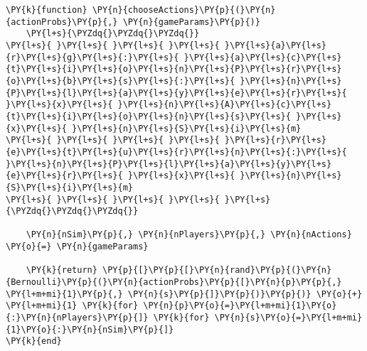\documentclass[main.tex]{subfiles}
\begin{document}
    \begin{tcolorbox}[breakable, size=fbox, boxrule=1pt, pad at break*=1mm,colback=cellbackground, colframe=cellborder]
\begin{Verbatim}[commandchars=\\\{\}]
\PY{k}{function} \PY{n}{chooseActions}\PY{p}{(}\PY{n}{actionProbs}\PY{p}{,} \PY{n}{gameParams}\PY{p}{)}
    \PY{l+s}{\PYZdq{}\PYZdq{}\PYZdq{}}
\PY{l+s}{ }\PY{l+s}{ }\PY{l+s}{ }\PY{l+s}{ }\PY{l+s}{a}\PY{l+s}{r}\PY{l+s}{g}\PY{l+s}{:}\PY{l+s}{ }\PY{l+s}{a}\PY{l+s}{c}\PY{l+s}{t}\PY{l+s}{i}\PY{l+s}{o}\PY{l+s}{n}\PY{l+s}{P}\PY{l+s}{r}\PY{l+s}{o}\PY{l+s}{b}\PY{l+s}{s}\PY{l+s}{:}\PY{l+s}{ }\PY{l+s}{n}\PY{l+s}{P}\PY{l+s}{l}\PY{l+s}{a}\PY{l+s}{y}\PY{l+s}{e}\PY{l+s}{r}\PY{l+s}{ }\PY{l+s}{x}\PY{l+s}{ }\PY{l+s}{n}\PY{l+s}{A}\PY{l+s}{c}\PY{l+s}{t}\PY{l+s}{i}\PY{l+s}{o}\PY{l+s}{n}\PY{l+s}{s}\PY{l+s}{ }\PY{l+s}{x}\PY{l+s}{ }\PY{l+s}{n}\PY{l+s}{S}\PY{l+s}{i}\PY{l+s}{m}
\PY{l+s}{ }\PY{l+s}{ }\PY{l+s}{ }\PY{l+s}{ }\PY{l+s}{r}\PY{l+s}{e}\PY{l+s}{t}\PY{l+s}{u}\PY{l+s}{r}\PY{l+s}{n}\PY{l+s}{:}\PY{l+s}{ }\PY{l+s}{n}\PY{l+s}{P}\PY{l+s}{l}\PY{l+s}{a}\PY{l+s}{y}\PY{l+s}{e}\PY{l+s}{r}\PY{l+s}{ }\PY{l+s}{x}\PY{l+s}{ }\PY{l+s}{n}\PY{l+s}{S}\PY{l+s}{i}\PY{l+s}{m}
\PY{l+s}{ }\PY{l+s}{ }\PY{l+s}{ }\PY{l+s}{ }\PY{l+s}{\PYZdq{}\PYZdq{}\PYZdq{}}
    
    \PY{n}{nSim}\PY{p}{,} \PY{n}{nPlayers}\PY{p}{,} \PY{n}{nActions} \PY{o}{=} \PY{n}{gameParams}

    \PY{k}{return} \PY{p}{[}\PY{p}{[}\PY{n}{rand}\PY{p}{(}\PY{n}{Bernoulli}\PY{p}{(}\PY{n}{actionProbs}\PY{p}{[}\PY{n}{p}\PY{p}{,} \PY{l+m+mi}{1}\PY{p}{,} \PY{n}{s}\PY{p}{]}\PY{p}{)}\PY{p}{)} \PY{o}{+} \PY{l+m+mi}{1} \PY{k}{for} \PY{n}{p}\PY{o}{=}\PY{l+m+mi}{1}\PY{o}{:}\PY{n}{nPlayers}\PY{p}{]} \PY{k}{for} \PY{n}{s}\PY{o}{=}\PY{l+m+mi}{1}\PY{o}{:}\PY{n}{nSim}\PY{p}{]}
\PY{k}{end}
\end{Verbatim}
\end{tcolorbox}
\end{document}
